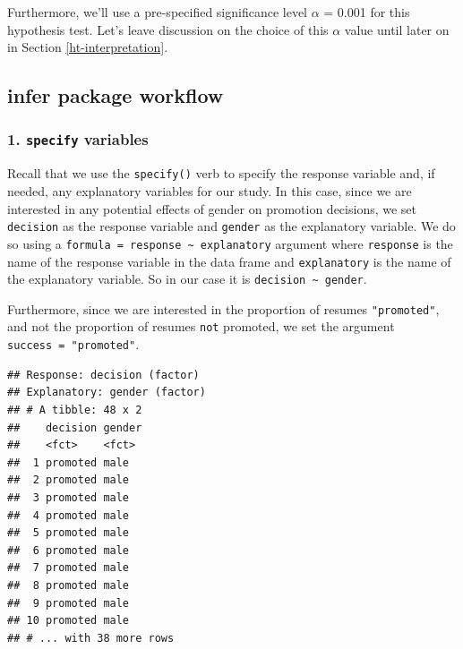 \documentclass[
]{book}
\newenvironment{Shaded}{\begin{snugshade}}{\end{snugshade}}
\newcommand{\DataTypeTok}[1]{\textcolor[rgb]{0.13,0.29,0.53}{#1}}
\newcommand{\KeywordTok}[1]{\textcolor[rgb]{0.13,0.29,0.53}{\textbf{#1}}}
\newcommand{\NormalTok}[1]{#1}
\newcommand{\OperatorTok}[1]{\textcolor[rgb]{0.81,0.36,0.00}{\textbf{#1}}}
\newcommand{\StringTok}[1]{\textcolor[rgb]{0.31,0.60,0.02}{#1}}
\begin{document}
Furthermore, we'll use a pre-specified significance level \(\alpha\) = 0.001 for this hypothesis test. Let's leave discussion on the choice of this \(\alpha\) value until later on in Section \ref{ht-interpretation}.

\hypertarget{infer-workflow-ht}{%
\subsection{infer package workflow}\label{infer-workflow-ht}}

\hypertarget{specify-variables}{%
\subsubsection*{\texorpdfstring{1. \texttt{specify} variables}{1. specify variables}}\label{specify-variables}}

Recall that we use the \texttt{specify()}  verb to specify the response variable and, if needed, any explanatory variables for our study. In this case, since we are interested in any potential effects of gender on promotion decisions, we set \texttt{decision} as the response variable and \texttt{gender} as the explanatory variable. We do so using a \texttt{formula\ =\ response\ \textasciitilde{}\ explanatory} argument where \texttt{response} is the name of the response variable in the data frame and \texttt{explanatory} is the name of the explanatory variable. So in our case it is \texttt{decision\ \textasciitilde{}\ gender}.

Furthermore, since we are interested in the proportion of resumes \texttt{"promoted"}, and not the proportion of resumes \texttt{not} promoted, we set the argument \texttt{success\ =\ "promoted"}.

\begin{Shaded}
\end{Shaded}

\begin{verbatim}
## Response: decision (factor)
## Explanatory: gender (factor)
## # A tibble: 48 x 2
##    decision gender
##    <fct>    <fct> 
##  1 promoted male  
##  2 promoted male  
##  3 promoted male  
##  4 promoted male  
##  5 promoted male  
##  6 promoted male  
##  7 promoted male  
##  8 promoted male  
##  9 promoted male  
## 10 promoted male  
## # ... with 38 more rows
\end{verbatim}
\end{document}
